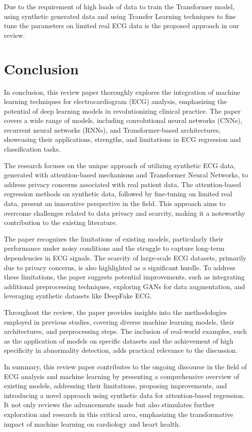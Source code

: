 \documentclass[conference]{IEEEtran}
\begin{document}
Due to the requirement of high loads of data to train the Transformer model, using synthetic generated data and using Transfer Learning techniques to fine tune the parameters on limited real ECG data is the proposed approach in our review.

\section{Conclusion}

In conclusion, this review paper thoroughly explores the integration of machine learning techniques for electrocardiogram (ECG) analysis, emphasizing the potential of deep learning models in revolutionizing clinical practice. The paper covers a wide range of models, including convolutional neural networks (CNNs), recurrent neural networks (RNNs), and Transformer-based architectures, showcasing their applications, strengths, and limitations in ECG regression and classification tasks.

The research focuses on the unique approach of utilizing synthetic ECG data, generated with attention-based mechanisms and Transformer Neural Networks, to address privacy concerns associated with real patient data. The attention-based regression methods on synthetic data, followed by fine-tuning on limited real data, present an innovative perspective in the field. This approach aims to overcome challenges related to data privacy and scarcity, making it a noteworthy contribution to the existing literature.

The paper recognizes the limitations of existing models, particularly their performance under noisy conditions and the struggle to capture long-term dependencies in ECG signals. The scarcity of large-scale ECG datasets, primarily due to privacy concerns, is also highlighted as a significant hurdle. To address these limitations, the paper suggests potential improvements, such as integrating additional preprocessing techniques, exploring GANs for data augmentation, and leveraging synthetic datasets like DeepFake ECG.

Throughout the review, the paper provides insights into the methodologies employed in previous studies, covering diverse machine learning models, their architectures, and preprocessing steps. The inclusion of real-world examples, such as the application of models on specific datasets and the achievement of high specificity in abnormality detection, adds practical relevance to the discussion.

In summary, this review paper contributes to the ongoing discourse in the field of ECG analysis and machine learning by presenting a comprehensive overview of existing models, addressing their limitations, proposing improvements, and introducing a novel approach using synthetic data for attention-based regression. It not only reviews the advancements made but also stimulates further exploration and research in this critical area, emphasizing the transformative impact of machine learning on cardiology and heart health.
\end{document}

